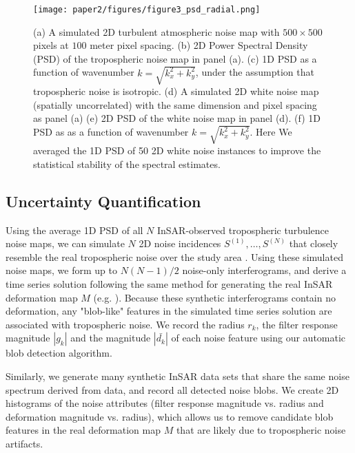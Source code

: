 \documentclass{utexasthesis}
\begin{document}
\begin{figure}
	\centering 
	\texttt{[image: paper2/figures/figure3\_psd\_radial.png]}
	\caption[Example 1D tropospheric PSD estimation]{
		(a) A simulated 2D turbulent atmospheric noise map with $ 500 \times 500 $ pixels at $100$ meter pixel spacing.
		(b) 2D Power Spectral Density (PSD) of the tropospheric noise map in panel (a).
		(c) 1D PSD as a function of wavenumber $k = \sqrt{k_x^2 + k_y^2}$, under the assumption that tropospheric noise is isotropic.
		(d) A simulated 2D white noise map (spatially uncorrelated) with the same dimension and pixel spacing as panel (a)
		(e) 2D PSD of the white noise map in panel (d).
		(f) 1D PSD as as a function of wavenumber $k = \sqrt{k_x^2 + k_y^2}$. Here We averaged the 1D PSD of 50 2D white noise instances to improve the statistical stability of the spectral estimates.
	}
	\label{fig:psd-example}
\end{figure}


\subsection{Uncertainty Quantification}
\label{subsec:methods-3-noise-sim}

Using the average 1D PSD of all $N$ InSAR-observed tropospheric turbulence noise maps, we can simulate $N$ 2D noise incidences  $S^{(1)},\dots, S^{(N)} $ that closely resemble the real tropospheric noise over the study area \cite{Hanssen2001RadarInterferometryData}. Using these simulated noise maps, we form up to $N(N-1)/2$ noise-only interferograms, and derive a time series solution following the same method for generating the real InSAR deformation map $M$ (e.g. \cite{Sandwell1998PhaseGradientApproach, Berardino2002NewAlgorithmSurface}). Because these synthetic interferograms contain no deformation, any "blob-like" features in the simulated time series solution are associated with tropospheric noise. We record the radius $r_k$,  the filter response magnitude $|g_k|$ and the magnitude $|\bar{d_k}|$ of each noise feature using our automatic blob detection algorithm.

Similarly, we generate many synthetic InSAR data sets that share the same noise spectrum derived from data, and record all detected noise blobs. We create 2D histograms of the noise attributes (filter response magnitude vs. radius and deformation magnitude vs. radius), which allows us to remove candidate blob features in the real deformation map $M$ that are likely due to tropospheric noise artifacts.
\end{document}
